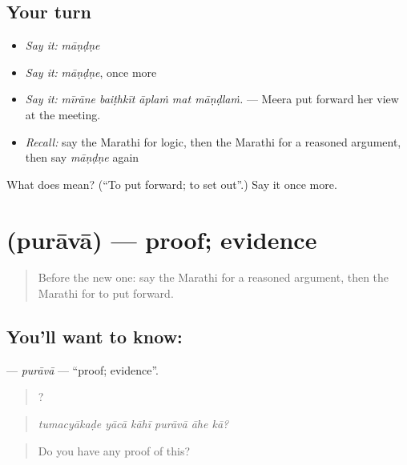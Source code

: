 \subsection*{Your turn}
\begin{itemize}
\raggedright
  \item \emph{Say it:} \emph{māṇḍṇe}
  \item \emph{Say it:} \emph{māṇḍṇe}, once more
  \item \emph{Say it:} \emph{mīrāne baiṭhkīt āplaṁ mat māṇḍlaṁ.} — Meera put forward her view at the meeting.
  \item \emph{Recall:} say the Marathi for logic, then the Marathi for a reasoned argument, then say \emph{māṇḍṇe} again
\end{itemize}

\begin{tcolorbox}[breakable,colback=teal!4,colframe=teal!35!black,title={Before you move on}]
What does  mean? (\textquotedblleft{}To put forward; to set out\textquotedblright{}.) Say it once more.
\end{tcolorbox}
\section[\texorpdfstring{\mr{पुरावा} (purāvā)}{पुरावा (purāvā)}]{ (purāvā) — proof; evidence}

\label{lesson:MR-C343-purava}



\begin{quote}
Before the new one: say the Marathi for a reasoned argument, then the Marathi for to put forward.
\end{quote}

\subsection*{You'll want to know: }
\textbf{} — \emph{purāvā} — \textquotedblleft{}proof; evidence\textquotedblright{}.

\begin{quote}
     ?
\end{quote}

\begin{quote}
\emph{tumacyākaḍe yācā kāhī purāvā āhe kā?}
\end{quote}

\begin{quote}
Do you have any proof of this?
\end{quote}

